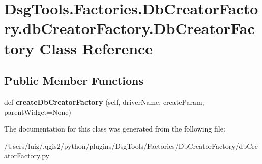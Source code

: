 \hypertarget{class_dsg_tools_1_1_factories_1_1_db_creator_factory_1_1db_creator_factory_1_1_db_creator_factory}{}\section{Dsg\+Tools.\+Factories.\+Db\+Creator\+Factory.\+db\+Creator\+Factory.\+Db\+Creator\+Factory Class Reference}
\label{class_dsg_tools_1_1_factories_1_1_db_creator_factory_1_1db_creator_factory_1_1_db_creator_factory}
\subsection*{Public Member Functions}
\begin{DoxyCompactItemize}
\item 
\mbox{\label{class_dsg_tools_1_1_factories_1_1_db_creator_factory_1_1db_creator_factory_1_1_db_creator_factory_a2f24173c6420b5bc595155bf6ad68371}} 
def {\bfseries create\+Db\+Creator\+Factory} (self, driver\+Name, create\+Param, parent\+Widget=None)
\end{DoxyCompactItemize}


The documentation for this class was generated from the following file\+:\begin{DoxyCompactItemize}
\item 
/\+Users/luiz/.\+qgis2/python/plugins/\+Dsg\+Tools/\+Factories/\+Db\+Creator\+Factory/db\+Creator\+Factory.\+py\end{DoxyCompactItemize}
